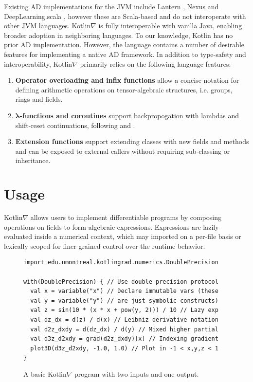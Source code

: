 \documentclass{article}
\newcommand{\squeezeup}{\vspace{-2.5mm}}
\begin{document}
Existing AD implementations for the JVM include Lantern \cite{DBLP:journals/corr/abs-1803-10228}, Nexus \cite{chen2017typesafe} and DeepLearning.scala \cite{dl4s}, however these are Scala-based and do not interoperate with other JVM languages. Kotlin$\nabla$ is fully interoperable with vanilla Java, enabling broader adoption in neighboring languages. To our knowledge, Kotlin has no prior AD implementation. However, the language contains a number of desirable features for implementing a native AD framework. In addition to type-safety and interoperability, Kotlin$\nabla$ primarily relies on the following language features:
\squeezeup\squeezeup
\begin{enumerate}[itemsep=-0.5ex]
  \item \textbf{Operator overloading and infix functions} allow a concise notation for defining arithmetic operations on tensor-algebraic structures, i.e. groups, rings and fields.
  \item \textbf{$\mathbf{\lambda}$-functions and coroutines} support backpropogation with lambdas and shift-reset continuations, following \citealt{pearlmutter2008reverse} and \citealt{DBLP:journals/corr/abs-1803-10228}.
  \item \textbf{Extension functions} support extending classes with new fields and methods and can be exposed to external callers without requiring sub-classing or inheritance.
\end{enumerate}
\squeezeup\squeezeup
\section{Usage}

Kotlin$\nabla$ allows users to implement differentiable programs by composing operations on fields to form algebraic expressions. Expressions are lazily evaluated inside a numerical context, which may imported on a per-file basis or lexically scoped for finer-grained control over the runtime behavior.

\begin{figure}[!htb]
\begin{verbatim}
import edu.umontreal.kotlingrad.numerics.DoublePrecision

with(DoublePrecision) { // Use double-precision protocol
  val x = variable("x") // Declare immutable vars (these
  val y = variable("y") // are just symbolic constructs)
  val z = sin(10 * (x * x + pow(y, 2))) / 10 // Lazy exp
  val dz_dx = d(z) / d(x) // Leibniz derivative notation
  val d2z_dxdy = d(dz_dx) / d(y) // Mixed higher partial
  val d3z_d2xdy = grad(d2z_dxdy)[x] // Indexing gradient
  plot3D(d3z_d2xdy, -1.0, 1.0) // Plot in -1 < x,y,z < 1
}
\end{verbatim}
\squeezeup\squeezeup
\caption{A basic Kotlin$\nabla$ program with two inputs and one output.}
\label{label:fig1}
\end{figure}
\end{document}
